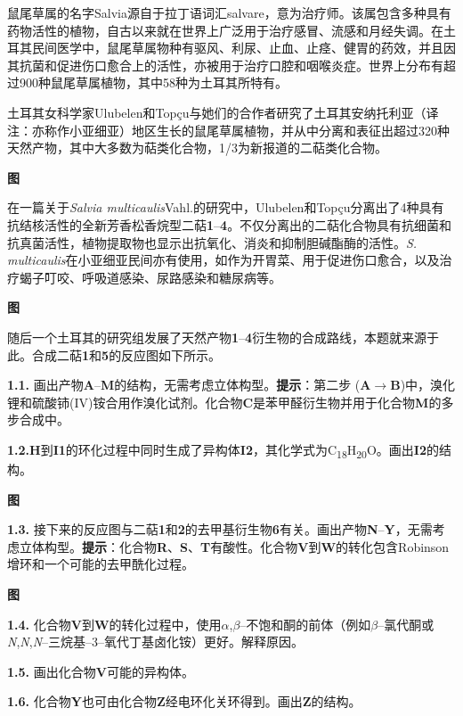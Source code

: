 鼠尾草属的名字Salvia源自于拉丁语词汇salvare，意为治疗师。该属包含多种具有药物活性的植物，自古以来就在世界上广泛用于治疗感冒、流感和月经失调。在土耳其民间医学中，鼠尾草属物种有驱风、利尿、止血、止痉、健胃的药效，并且因其抗菌和促进伤口愈合上的活性，亦被用于治疗口腔和咽喉炎症。世界上分布有超过900种鼠尾草属植物，其中58种为土耳其所特有。

土耳其女科学家Ulubelen和Topçu与她们的合作者研究了土耳其安纳托利亚（译注：亦称作小亚细亚）地区生长的鼠尾草属植物，并从中分离和表征出超过320种天然产物，其中大多数为萜类化合物，1/3为新报道的二萜类化合物。

\textbf{图}

在一篇关于\emph{Salvia multicaulis}Vahl.的研究中，Ulubelen和Topçu分离出了4种具有抗结核活性的全新芳香松香烷型二萜\textbf{1}--\textbf{4}。不仅分离出的二萜化合物具有抗细菌和抗真菌活性，植物提取物也显示出抗氧化、消炎和抑制胆碱酯酶的活性。\emph{S. multicaulis}在小亚细亚民间亦有使用，如作为开胃菜、用于促进伤口愈合，以及治疗蝎子叮咬、呼吸道感染、尿路感染和糖尿病等。

\textbf{图}

随后一个土耳其的研究组发展了天然产物\textbf{1}--\textbf{4}衍生物的合成路线，本题就来源于此。合成二萜\textbf{1}和\textbf{5}的反应图如下所示。

\noindent\textbf{1.1.} 画出产物\textbf{A}--\textbf{M}的结构，无需考虑立体构型。\textbf{提示}：第二步 (\textbf{A}$\rightarrow$\textbf{B})中，溴化锂和硫酸铈(IV)铵合用作溴化试剂。化合物\textbf{C}是苯甲醛衍生物并用于化合物\textbf{M}的多步合成中。

\noindent\textbf{1.2.}\textbf{H}到\textbf{I1}的环化过程中同时生成了异构体\textbf{I2}，其化学式为C\textsubscript{18}H\textsubscript{20}O。画出\textbf{I2}的结构。


\textbf{图}

\noindent\textbf{1.3.} 接下来的反应图与二萜\textbf{1}和\textbf{2}的去甲基衍生物\textbf{6}有关。画出产物\textbf{N}--\textbf{Y}，无需考虑立体构型。\textbf{提示}：化合物\textbf{R}、\textbf{S}、\textbf{T}有酸性。化合物\textbf{V}到\textbf{W}的转化包含Robinson增环和一个可能的去甲酰化过程。

\textbf{图}

\noindent\textbf{1.4.} 化合物\textbf{V}到\textbf{W}的转化过程中，使用$\alpha$,$\beta$--不饱和酮的前体（例如$\beta$--氯代酮或\emph{N},\emph{N},\emph{N}--三烷基--3--氧代丁基卤化铵）更好。解释原因。

\noindent\textbf{1.5.} 画出化合物\textbf{V}可能的异构体。

\noindent\textbf{1.6.} 化合物\textbf{Y}也可由化合物\textbf{Z}经电环化关环得到。画出\textbf{Z}的结构。

